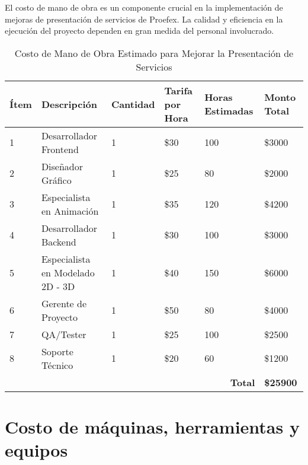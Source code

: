El costo de mano de obra es un componente crucial en la implementación de mejoras de 
presentación de servicios de Proefex. La calidad y eficiencia en la ejecución del proyecto 
dependen en gran medida del personal involucrado. 

\newpage

\begin{table}[htbp]
    \centering
    \begin{tabular}{|p{1cm}|p{2.5cm}|p{1.5cm}|p{1.5cm}|p{1.5cm}|p{1.5cm}|}
    \hline
    \textbf{Ítem} & \textbf{Descripción} & \textbf{Cantidad} & \textbf{Tarifa por Hora} & \textbf{Horas Estimadas} & \textbf{Monto Total} \\
    \hline
    1 & Desarrollador Frontend & 1 & \$30 & 100 & \$3000 \\
    \hline
    2 & Diseñador Gráfico & 1 & \$25 & 80 & \$2000 \\
    \hline
    3 & Especialista en Animación & 1 & \$35 & 120 & \$4200 \\
    \hline
    4 & Desarrollador Backend & 1 & \$30 & 100 & \$3000 \\
    \hline
    5 & Especialista en Modelado 2D - 3D & 1 & \$40 & 150 & \$6000 \\
    \hline
    6 & Gerente de Proyecto & 1 & \$50 & 80 & \$4000 \\
    \hline
    7 & QA/Tester & 1 & \$25 & 100 & \$2500 \\
    \hline
    8 & Soporte Técnico & 1 & \$20 & 60 & \$1200 \\
    \hline
    \multicolumn{5}{|r|}{\textbf{Total}} & \textbf{\$25900} \\
    \hline
    \end{tabular}
    \caption{Costo de Mano de Obra Estimado para Mejorar la Presentación de Servicios}
    \label{tab:costo_mano_de_obra}
\end{table}

\section{Costo de máquinas, herramientas y equipos}

